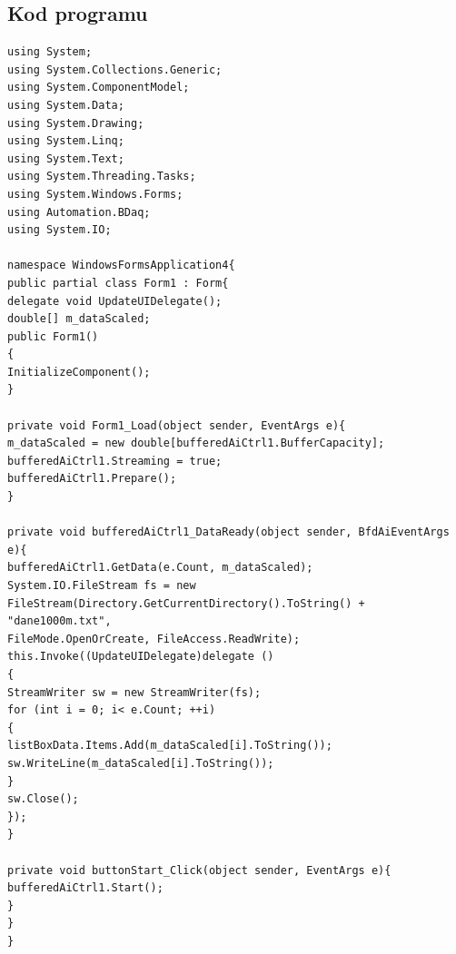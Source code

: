 \documentclass[12pt]{article}
\begin{document}
\subsection{Kod  programu}
\begin{verbatim}
using System;
using System.Collections.Generic;
using System.ComponentModel;
using System.Data;
using System.Drawing;
using System.Linq;
using System.Text;
using System.Threading.Tasks;
using System.Windows.Forms;
using Automation.BDaq;
using System.IO;

namespace WindowsFormsApplication4{
public partial class Form1 : Form{
delegate void UpdateUIDelegate();
double[] m_dataScaled;
public Form1()
{
InitializeComponent();
}

private void Form1_Load(object sender, EventArgs e){
m_dataScaled = new double[bufferedAiCtrl1.BufferCapacity];
bufferedAiCtrl1.Streaming = true;
bufferedAiCtrl1.Prepare();
}

private void bufferedAiCtrl1_DataReady(object sender, BfdAiEventArgs e){
bufferedAiCtrl1.GetData(e.Count, m_dataScaled);
System.IO.FileStream fs = new FileStream(Directory.GetCurrentDirectory().ToString() + "dane1000m.txt",
FileMode.OpenOrCreate, FileAccess.ReadWrite);
this.Invoke((UpdateUIDelegate)delegate ()
{
StreamWriter sw = new StreamWriter(fs);
for (int i = 0; i< e.Count; ++i)
{
listBoxData.Items.Add(m_dataScaled[i].ToString());
sw.WriteLine(m_dataScaled[i].ToString());
}
sw.Close();
});
}

private void buttonStart_Click(object sender, EventArgs e){
bufferedAiCtrl1.Start();
}
}
}


\end{verbatim}
\end{document}
